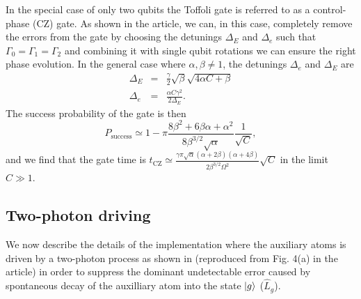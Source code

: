 In the special case of only two qubits the Toffoli gate is referred to as a
control-phase (CZ) gate. As shown in the article, we can, in this case,
completely remove the errors from the gate by choosing the detunings
$\Delta_{E}$ and $\Delta_{e}$ such that $\Gamma_{0}=\Gamma_{1}=\Gamma_{2}$ and
combining it with single qubit rotations we can ensure the right phase
evolution. In the general case where $\alpha,\beta\neq1$, the detunings
$\Delta_{e}$ and $\Delta_{E}$ are
\begin{eqnarray}
\Delta_{E}&=&\frac{\gamma}{2}\sqrt{\beta}\sqrt{4\alpha C+\beta} \\
\Delta_{e}&=&\frac{\alpha C\gamma^{2}}{2\Delta_{E}}. 
\end{eqnarray}
The success probability of the gate is then
\begin{equation}
P_{\text{success}}\simeq1-\pi\frac{8\beta^{2}+6\beta\alpha+\alpha^{2}}{8\beta^{3/2}\sqrt{\alpha}}\frac{1}{\sqrt{C}},
\end{equation} 
and we find that the gate time is
$t_{\text{CZ}}\simeq\frac{\gamma\pi\sqrt{\alpha}(\alpha+2\beta)(\alpha+4\beta)}{2\beta^{3/2}\Omega^{2}}\sqrt{C}$
in the limit $C\gg1$.
\subsection{Two-photon driving}

We now describe the details of the implementation where the auxiliary atoms is
driven by a two-photon process as shown in  (reproduced
from Fig. 4(a) in the article) in order to suppress the dominant undetectable
error caused by spontaneous decay of the auxilliary atom into the state
$| g \rangle$ ($\hat{L}_{g}$).

